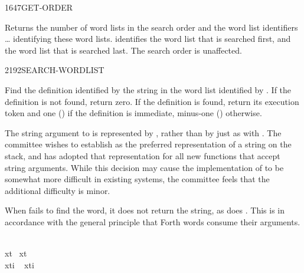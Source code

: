 \begin{worddef}{1647}{GET-ORDER}
\item {}

	Returns the number of word lists  in the search order
	and the word list identifiers  {\ldots} 
	identifying these word lists.  identifies the word
	list that is searched first, and  the word list that
	is searched last. The search order is unaffected.
\end{worddef}


\begin{worddef}{2192}{SEARCH-WORDLIST}
\item {}

	Find the definition identified by the string  in
	the word list identified by . If the definition is not
	found, return zero. If the definition is found, return its
	execution token  and one () if the definition is
	immediate, minus-one () otherwise.

	\begin{rationale} %
		The string argument to  is represented
		by , rather than by just  as
		with . The committee wishes to establish
		 as the preferred representation of a string
		on the stack, and has adopted that representation for all new
		functions that accept string arguments. While this decision
		may cause the implementation of  to be
		somewhat more difficult in existing systems, the committee
		feels that the additional difficulty is minor.

		When  fails to find the word, it does
		not return the string, as does . This is in
		accordance with the general principle that Forth words consume
		their arguments.
	\end{rationale}

	\begin{testing}\ttfamily
	\cbstart{}
		   \\
		 xt~   xt~ \word{!} \\
		 xti  ~ xti \word{!}  

		 \\
		 \\
	\cbend
	\end{testing}
\end{worddef}


